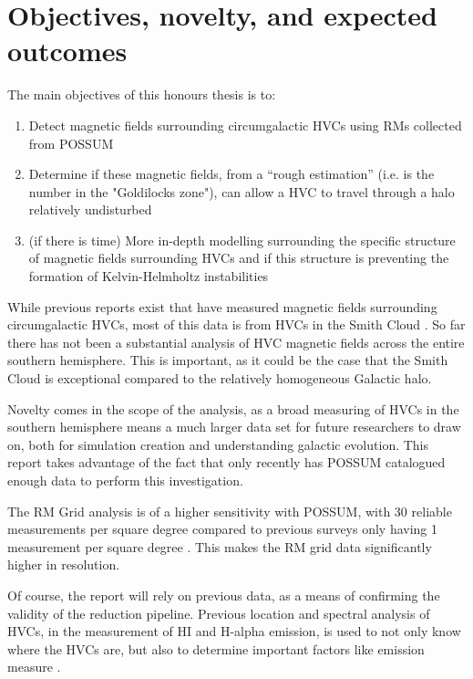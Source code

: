 \section{Objectives, novelty, and expected outcomes}
\label{sec:objectives}

The main objectives of this honours thesis is to:
\begin{enumerate}
\item Detect magnetic fields surrounding circumgalactic HVCs using RMs collected from POSSUM
\item Determine if these magnetic fields, from a “rough estimation” (i.e. is the number in the "Goldilocks zone"), can allow a HVC to travel through a halo relatively undisturbed
\item (if there is time) More in-depth modelling surrounding the specific structure of magnetic fields surrounding HVCs and if this structure is preventing the formation of Kelvin-Helmholtz instabilities
\end{enumerate}

While previous reports exist that have measured magnetic fields surrounding circumgalactic HVCs, most of this data is from HVCs in the Smith Cloud \cite{ID2, ID5, ID23, ID26}. So far there has not been a substantial analysis of HVC magnetic fields  across the entire southern hemisphere. This is important, as it could be the case that the Smith Cloud is exceptional compared to the relatively homogeneous Galactic halo.

Novelty comes in the scope of the analysis, as a broad measuring of HVCs in the southern hemisphere means a much larger data set for future researchers to draw on, both for simulation creation and understanding galactic evolution. This report takes advantage of the fact that only recently has POSSUM catalogued enough data to perform this investigation.

The RM Grid analysis is of a higher sensitivity with POSSUM, with 30 reliable measurements per square degree compared to previous surveys only having 1 measurement per square degree \cite{ID18, ID1}. This makes the RM grid data significantly higher in resolution.

Of course, the report will rely on previous data, as a means of confirming the validity of the reduction pipeline. Previous location and spectral analysis of HVCs, in the measurement of HI and H-alpha emission, is used to not only know where the HVCs are, but also to determine important factors like emission measure \cite{ID5, ID26, ID30}.

